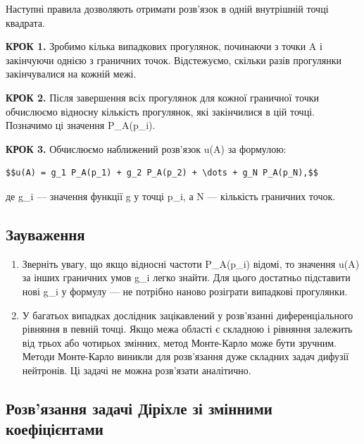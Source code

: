 \documentclass[
  ukrainian,
]{article}
\begin{document}
Наступні правила дозволяють отримати розв'язок в одній внутрішній точці
квадрата.

\textbf{КРОК 1.} Зробимо кілька випадкових прогулянок, починаючи з точки
A і закінчуючи однією з граничних точок. Відстежуємо, скільки разів
прогулянки закінчувалися на кожній межі.

\textbf{КРОК 2.} Після завершення всіх прогулянок для кожної граничної
точки обчислюємо відносну кількість прогулянок, які закінчилися в цій
точці. Позначимо ці значення P\_A(p\_i).

\textbf{КРОК 3.} Обчислюємо наближений розв'язок u(A) за формулою:

\begin{verbatim}
$$u(A) = g_1 P_A(p_1) + g_2 P_A(p_2) + \dots + g_N P_A(p_N),$$
\end{verbatim}

де g\_i --- значення функції g у точці p\_i, а N --- кількість граничних
точок.

\subsection{Зауваження}\label{ux437ux430ux443ux432ux430ux436ux435ux43dux43dux44f-15}

\begin{enumerate}
\def\labelenumi{\arabic{enumi}.}
\item
  Зверніть увагу, що якщо відносні частоти P\_A(p\_i) відомі, то
  значення u(A) за інших граничних умов g\_i легко знайти. Для цього
  достатньо підставити нові g\_i у формулу --- не потрібно наново
  розіграти випадкові прогулянки.
\item
  У багатьох випадках дослідник зацікавлений у розв'язанні
  диференціального рівняння в певній точці. Якщо межа області є складною
  і рівняння залежить від трьох або чотирьох змінних, метод Монте-Карло
  може бути зручним. Методи Монте-Карло виникли для розв'язання дуже
  складних задач дифузії нейтронів. Ці задачі не можна розв'язати
  аналітично.
\end{enumerate}

\subsection{Розв'язання задачі Діріхле зі змінними
коефіцієнтами}\label{ux440ux43eux437ux432ux44fux437ux430ux43dux43dux44f-ux437ux430ux434ux430ux447ux456-ux434ux456ux440ux456ux445ux43bux435-ux437ux456-ux437ux43cux456ux43dux43dux438ux43cux438-ux43aux43eux435ux444ux456ux446ux456ux454ux43dux442ux430ux43cux438}
\end{document}
